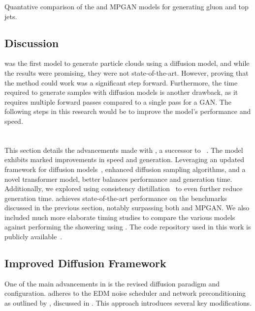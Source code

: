 \begin{table}[hbpt]
    \centering
    \caption{Quantative comparison of the \pcjedi and MPGAN models for generating gluon and top jets.}
    \label{tab:combined_results}
    \renewcommand{\arraystretch}{1.5}
    \resizebox{\textwidth}{!}{
        
    }
\end{table}

\subsection{Discussion}

\pcjedi was the first model to generate particle clouds using a diffusion model, and while the results were promising, they were not state-of-the-art.
However, proving that the method could work was a significant step forward.
Furthermore, the time required to generate samples with diffusion models is another drawback, as it requires multiple forward passes compared to a single pass for a GAN.
The following steps in this research would be to improve the model's performance and speed.

\section{\pcdroid}

This section details the advancements made with \pcdroid, a successor to \pcjedi~\cite{PCDroid}.
The \pcdroid model exhibits marked improvements in speed and generation.
Leveraging an updated framework for diffusion models~\cite{ElucidatingDesignSpace}, enhanced diffusion sampling algorithms, and a novel transformer model, \pcdroid better balances performance and generation time.
Additionally, we explored using consistency distillation~\cite{ConsistencyModels} to even further reduce generation time.
\pcdroid achieves state-of-the-art performance on the benchmarks discussed in the previous section, notably surpassing both \pcjedi and MPGAN.
We also included much more elaborate timing studies to compare the various models against performing the showering using \pythia.
The code repository used in this work is publicly available~\cite{PCDroidCode}.

\subsection{Improved Diffusion Framework}

One of the main advancements in \pcdroid is the revised diffusion paradigm and configuration.
\pcdroid adheres to the EDM noise scheduler and network preconditioning as outlined by \textcite{ElucidatingDesignSpace}, discussed in .
This approach introduces several key modifications.

